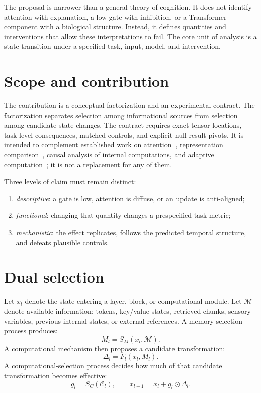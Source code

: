 \documentclass[10pt]{article}
\begin{document}
The proposal is narrower than a general theory of cognition. It does not identify attention with explanation, a low gate with inhibition, or a Transformer component with a biological structure. Instead, it defines quantities and interventions that allow these interpretations to fail. The core unit of analysis is a state transition under a specified task, input, model, and intervention.

\section{Scope and contribution}
The contribution is a conceptual factorization and an experimental contract. The factorization separates selection among informational sources from selection among candidate state changes. The contract requires exact tensor locations, task-level consequences, matched controls, and explicit null-result pivots. It is intended to complement established work on attention~\cite{vaswani2017attention}, representation comparison~\cite{kornblith2019cka}, causal analysis of internal computations, and adaptive computation~\cite{graves2016act}; it is not a replacement for any of them.

Three levels of claim must remain distinct:
\begin{enumerate}[leftmargin=*]
\item \emph{descriptive}: a gate is low, attention is diffuse, or an update is anti-aligned;
\item \emph{functional}: changing that quantity changes a prespecified task metric;
\item \emph{mechanistic}: the effect replicates, follows the predicted temporal structure, and defeats plausible controls.
\end{enumerate}

\section{Dual selection}
Let $x_l$ denote the state entering a layer, block, or computational module. Let $\mathcal{M}$ denote available information: tokens, key/value states, retrieved chunks, sensory variables, previous internal states, or external references. A memory-selection process produces:
\[
M_l = S_M(x_l,\mathcal{M}).
\]
A computational mechanism then proposes a candidate transformation:
\[
\Delta_l = F_l(x_l,M_l).
\]
A computational-selection process decides how much of that candidate transformation becomes effective:
\[
g_l = S_C(\mathcal{C}_l),
\qquad
x_{l+1}=x_l+g_l\odot\Delta_l.
\]
\end{document}
